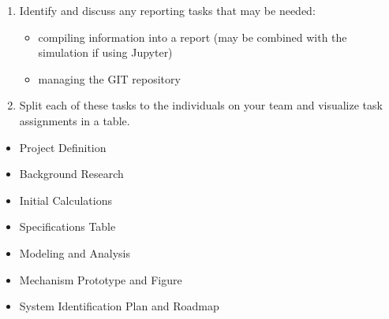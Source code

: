 \documentclass[12pt]{article}
\begin{document}
\begin{enumerate}
    \item Identify and discuss any reporting tasks that may be needed:
    \begin{itemize}
        \item compiling information into a report (may be combined with the simulation if using Jupyter)
        \item managing the GIT repository
    \end{itemize}
    
    \item Split each of these tasks to the individuals on your team and visualize task assignments in a table.
\end{enumerate}



\begin{itemize}
    \item Project Definition
    \item Background Research
    \item Initial Calculations
    \item Specifications Table
    \item Modeling and Analysis
    \item Mechanism Prototype and Figure
    \item System Identification Plan and Roadmap
\end{itemize}




\end{document}
